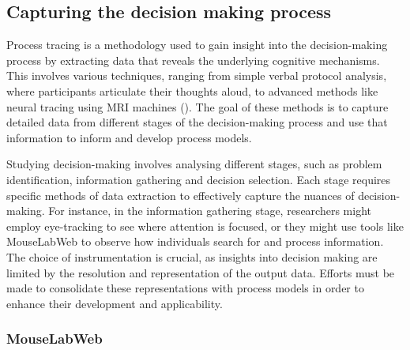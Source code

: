 \documentclass[man, floatsintext]{apa7}
\begin{document}

\subsection{Capturing the decision making process}

Process tracing is a methodology used to gain insight into the decision-making process by extracting data that reveals the underlying cognitive mechanisms. This involves various techniques, ranging from simple verbal protocol analysis, where participants articulate their thoughts aloud, to advanced methods like neural tracing using MRI machines (\cite{fordProcessTracingMethods1989}). The goal of these methods is to capture detailed data from different stages of the decision-making process and use that information to inform and develop process models.
	

Studying decision-making involves analysing different stages, such as problem identification, information gathering and decision selection. Each stage requires specific methods of data extraction to effectively capture the nuances of decision-making. For instance, in the information gathering stage, researchers might employ eye-tracking to see where attention is focused, or they might use tools like MouseLabWeb to observe how individuals search for and process information. The choice of instrumentation is crucial, as insights into decision making are limited by the resolution and representation of the output data. Efforts must be made to consolidate these representations with process models in order to enhance their development and applicability.

\subsubsection{MouseLabWeb}
\end{document}
